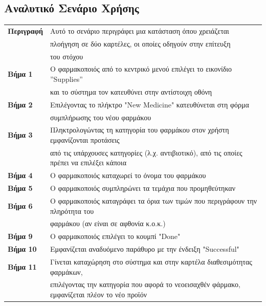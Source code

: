 \documentclass{article}
\newcommand\T{\rule{0pt}{2.6ex}}       %
\newcommand\B{\rule[-1.2ex]{0pt}{0pt}}
\begin{document}
 \subsection{Αναλυτικό Σενάριο Χρήσης}
 
 \begin{center}
     \begin{tabular}{|l|l|}
     \hline
      \textbf{Περιγραφή} & Αυτό το σενάριο περιγράφει μια κατάσταση όπου χρειάζεται \T \\& πλοήγηση σε δύο καρτέλες, οι οποίες οδηγούν στην επίτευξη \\& του στόχου \B \\ 
      \hline
      \textbf{Βήμα 1} & Ο φαρμακοποιός από το κεντρικό μενού επιλέγει το εικονίδιο ”Supplies” \T \\& και το σύστημα τον κατευθύνει στην αντίστοιχη οθόνη\\
      \hline
      \textbf{Βήμα 2} & Επιλέγοντας το πλήκτρο "New Medicine" κατευθύνεται στη φόρμα \T \\& συμπλήρωσης του νέου φαρμάκου \B \\
      \hline
      \textbf{Βήμα 3} & Πληκτρολογώντας τη κατηγορία του φαρμάκου στον χρήστη εμφανίζονται προτάσεις \T \\& από τις υπάρχουσες κατηγορίες (λ.χ. αντιβιοτικό), από τις οποίες πρέπει να επιλέξει κάποια \B \\
      \hline
      \textbf{Βήμα 4} & Ο φαρμακοποιός καταχωρεί το όνομα του φαρμάκου \T\B \\
      \hline
      \textbf{Βήμα 5} &  Ο φαρμακοποιός συμπληρώνει τα τεμάχια που προμηθεύτηκαν \T\B \\
      \hline
      \textbf{Βήμα 6} & Ο φαρμακοποιός καταγράφει τα όρια των τιμών που περιγράφουν την πληρότητα του \T \\& φαρμάκου (αν είναι σε αφθονία κ.ο.κ.)\B \\
      \hline
      \textbf{Βήμα 9} & Ο φαρμακοποιός επιλέγει το κουμπί "Done" \T\B \\
      \hline
      \textbf{Βήμα 10} & Εμφανίζεται αναδυόμενο παράθυρο με την ένδειξη "Successful" \T\B \\
      \hline    
      \textbf{Βήμα 11} & Γίνεται καταχώρηση στο σύστημα και στην καρτέλα διαθεσιμότητας φαρμάκων, \T \\& επιλέγοντας την κατηγορία  που αφορά το νεοεισαχθέν φάρμακο, εμφανίζεται πλέον το νέο προϊόν \B \\
      \hline
     \end{tabular}
 \end{center}
 
\end{document}
